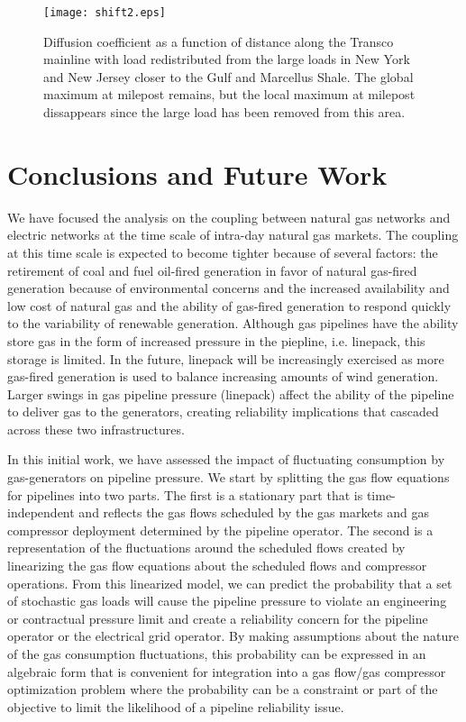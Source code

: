 \documentclass[10pt, conference, compsocconf]{IEEEtran}
\begin{document}
\begin{figure}
\centering
\texttt{[image: shift2.eps]}
\caption{Diffusion coefficient as a function of distance along the Transco
mainline with load redistributed from the large loads in New York and New
Jersey closer to the Gulf and Marcellus Shale.
The global maximum at milepost  remains, but the local maximum
at milepost  dissappears since the large load has been removed from
this area.
}
\label{shift2}
\end{figure}






\section{Conclusions and Future Work}
\label{sec:con}


We have focused the analysis on the coupling between natural gas networks and electric networks at the time scale of intra-day natural gas markets.  The coupling at this time scale is expected to become tighter because of several factors: the retirement of coal and fuel oil-fired generation in favor of natural gas-fired generation because of environmental concerns and the increased availability and low cost of natural gas and the ability of gas-fired generation to respond quickly to the variability of renewable generation.  Although gas pipelines have the ability store gas in the form of increased pressure in the piepline, i.e. linepack, this storage is limited.  In the future, linepack will be increasingly exercised as more gas-fired generation is used to balance increasing amounts of wind generation.  Larger swings in gas pipeline pressure (linepack) affect the ability of the pipeline to deliver gas to the generators, creating reliability implications that cascaded across these two infrastructures.



In this initial work, we have assessed the impact of fluctuating consumption by gas-generators on pipeline pressure. We start by splitting the gas flow equations for pipelines into two parts.  The first is a stationary part that is time-independent and reflects the gas flows scheduled by the gas markets and gas compressor deployment determined by the pipeline operator.  The second is a representation of the fluctuations around the scheduled flows created by linearizing the gas flow equations about the scheduled flows and compressor operations.  From this linearized model, we can predict the probability that a set of stochastic gas loads will cause the pipeline pressure to violate an engineering or contractual pressure limit and create a reliability concern for the pipeline operator or the electrical grid operator.  By making assumptions about the nature of the gas consumption fluctuations, this probability can be expressed in an algebraic form that is convenient for integration into a gas flow/gas compressor optimization problem where the probability can be a constraint or part of the objective to limit the likelihood of a pipeline reliability issue.
\end{document}
